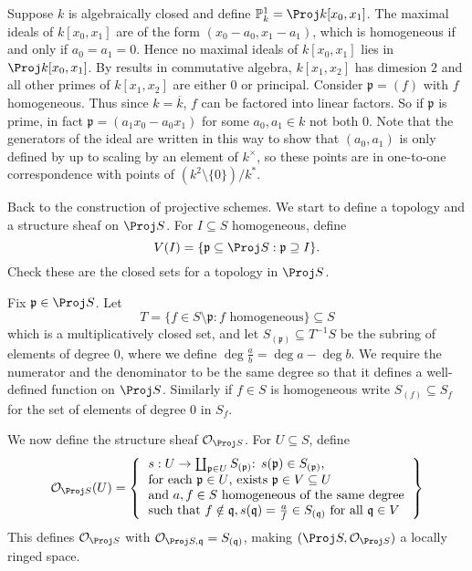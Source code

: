 \documentclass[a4paper]{article}
\renewcommand*{\P}{\mathbb{P}}
\newcommand{\sh}[1]{\mathcal{#1}} %
\begin{document}
\begin{eg}
  Suppose \(k\) is algebraically closed and define \(\P^1_k = \Proj k[x_0, x_1]\). The maximal ideals of \(k[x_0, x_1]\) are of the form \((x_0 - a_0, x_1 - a_1)\), which is homogeneous if and only if \(a_0 = a_1 = 0\). Hence no maximal ideals of \(k[x_0, x_1]\) lies in \(\Proj k[x_0, x_1]\). By results in commutative algebra, \(k[x_1, x_2]\) has dimesion \(2\) and all other primes of \(k[x_1, x_2]\) are either \(0\) or principal. Consider \(\mathfrak p = (f)\) with \(f\) homogeneous. Thus since \(k = \overline k\), \(f\) can be factored into linear factors. So if \(\mathfrak p\) is prime, in fact \(\mathfrak p = (a_1 x_0 - a_0 x_1)\) for some \(a_0, a_1 \in k\) not both \(0\). Note that the generators of the ideal are written in this way to show that \((a_0, a_1)\) is only defined by up to scaling by an element of \(k^\times\), so these points are in one-to-one correspondence with points of \((k^2 \setminus \{0\})/k^*\).
\end{eg}

Back to the construction of projective schemes. We start to define a topology and a structure sheaf on \(\Proj S\). For \(I \subseteq S\) homogeneous, define
\[
  V(I) = \{\mathfrak p \subseteq \Proj S: \mathfrak p \supseteq I\}.
\]
Check these are the closed sets for a topology in \(\Proj S\).

Fix \(\mathfrak p \in \Proj S\). Let
\[
  T = \{f \in S \setminus \mathfrak p: f \text{ homogeneous}\} \subseteq S
\]
which is a multiplicatively closed set, and let \(S_{(\mathfrak p)} \subseteq T^{-1}S\) be the subring of elements of degree \(0\), where we define \(\deg \frac{a}{b} = \deg a - \deg b\). We require the numerator and the denominator to be the same degree so that it defines a well-defined function on \(\Proj S\). Similarly if \(f \in S\) is homogeneous  write \(S_{(f)} \subseteq S_f\) for the set of elements of degree \(0\) in \(S_f\).

We now define the structure sheaf \(\sh O_{\Proj S}\). For \(U \subseteq S\), define
\[
  \sh O_{\Proj S}(U) =
  \left\{
    \begin{tabular}{l}
      \(s: U \to \coprod_{\mathfrak p \in U} S_{(\mathfrak p)}\): \(s(\mathfrak p) \in S_{(\mathfrak p)}\), \\
      for each \(\mathfrak p \in U\), exists \(\mathfrak p \in V \subseteq U\) \\
      and \(a, f \in S\) homogeneous of the same degree \\
      such that \(f \notin \mathfrak q, s(\mathfrak q) = \frac{a}{f} \in S_{(\mathfrak q)}\) for all \(\mathfrak q \in V\)
    \end{tabular}
  \right\}
\]
This defines \(\sh O_{\Proj S}\) with \(\sh O_{\Proj S, \mathfrak q} = S_{(\mathfrak q)}\), making \((\Proj S, \sh O_{\Proj S})\) a locally ringed space.
\end{document}
